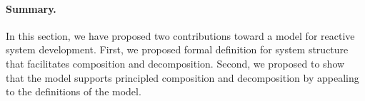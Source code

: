 \paragraph{Summary.}
In this section, we have proposed two contributions toward a model for reactive system development.
First, we proposed formal definition for system structure that facilitates composition and decomposition.
Second, we proposed to show that the model supports principled composition and decomposition by appealing to the definitions of the model. %
